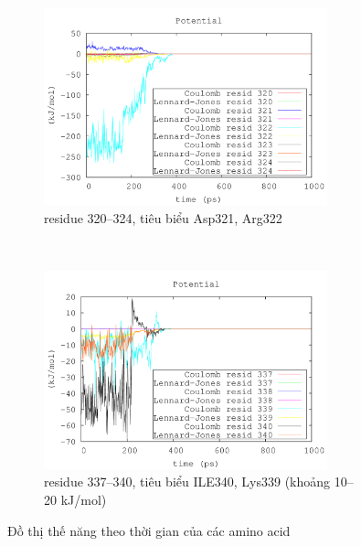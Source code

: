 \documentclass[12pt,a4paper,reqno, oneside]{book}
\begin{document}
\begin{figure}[h!]
\begin{subfigure}{\textwidth}
\includegraphics[width=0.9\textwidth,natwidth=610,natheight=642]{320-324}
\caption{\gls{residue} 320--324, tiêu biểu Asp321, Arg322}
\label{fig:322}
\end{subfigure}\\
\begin{subfigure}{\textwidth}
\includegraphics[width=0.9\textwidth,natwidth=610,natheight=642]{337-340}
\caption{\gls{residue} 337--340, tiêu biểu  ILE340, Lys339 (khoảng 10--20 kJ/mol)}
\label{fig:339}
\end{subfigure}
\caption{Đồ thị thế năng theo thời gian của các amino acid}
\label{fig:Coulomb3}
\end{figure}
\end{document}

